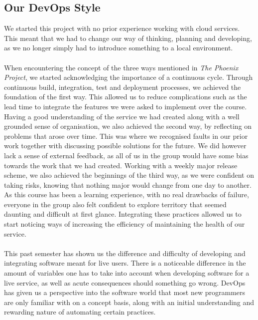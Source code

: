 


\subsection{Our DevOps Style}
We started this project with no prior experience working with cloud services. This meant that we had to change our way of thinking, planning and developing, as we no longer simply had to introduce something to a local environment.
\\\\
When encountering the concept of the three ways mentioned in \textit{The Phoenix Project}, we started acknowledging the importance of a continuous cycle. Through continuous build, integration, test and deployment processes, we achieved the foundation of the first way. This allowed us to reduce complications such as the lead time to integrate the features we were asked to implement over the course. Having a good understanding of the service we had created along with a well grounded sense of organisation, we also achieved the second way, by reflecting on problems that arose over time. This was where we recognised faults in our prior work together with discussing possible solutions for the future. We did however lack a sense of external feedback, as all of us in the group would have some bias towards the work that we had created. Working with a weekly major release scheme, we also achieved the beginnings of the third way, as we were confident on taking risks, knowing that nothing major would change from one day to another. As this course has been a learning experience, with no real drawbacks of failure, everyone in the group also felt confident to explore territory that seemed daunting and difficult at first glance. Integrating these practices allowed us to start noticing ways of increasing the efficiency of maintaining the health of our service. 
\\\\
This past semester has shown us the difference and difficulty of developing and integrating software meant for live users. There is a noticeable difference in the amount of variables one has to take into account when developing software for a live service, as well as acute consequences should something go wrong. DevOps has given us a perspective into the software world that most new programmers are only familiar with on a concept basis, along with an initial understanding and rewarding nature of automating certain practices. 







